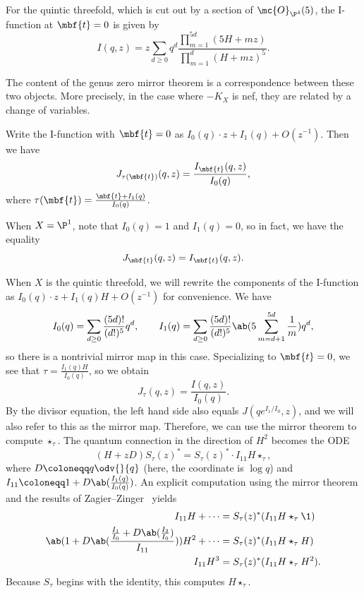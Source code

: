 \begin{exm}
    For the quintic threefold, which is cut out by a section of \(\mc{O}_{\P^4}(5)\), the I-function at \(\mbf{t} = 0\) is given by
    \[ I(q,z) = z \sum_{d \geq 0} q^d \frac{\prod_{m=1}^{5d}(5H+mz)}{\prod_{m=1}^d (H+mz)^5}. \]
\end{exm}

The content of the genus zero mirror theorem is a correspondence between these two objects. More precisely, in the case where \(-K_X\) is nef, they are related by a change of variables.

\begin{thm}
    Write the I-function with \(\mbf{t} = 0\) as \(I_0(q) \cdot z + I_1(q) + O(z^{-1})\). Then we have 
    \[
        J_{\tau(\mbf{t})}(q,z) = \frac{I_{\mbf{t}}(q,z)}{I_0(q)},
    \]
    where \(\tau(\mbf{t}) = \frac{\mbf{t} + I_1(q)}{I_0(q)}\). 
\end{thm}

\begin{exm}
    When \(X = \P^1\), note that \(I_0(q) = 1\) and \(I_1(q) = 0\), so in fact, we have the equality
    \[ J_{\mbf{t}}(q,z) = I_{\mbf{t}}(q,z). \]
\end{exm}

\begin{exm}
    When \(X\) is the quintic threefold, we will rewrite the components of the I-function as \(I_0(q) \cdot z + I_1(q)H + O(z^{-1})\) for convenience. We have
    \[ I_0(q) = \sum_{d \geq 0} \frac{(5d)!}{(d!)^5} q^d, \qquad I_1(q) = \sum_{d \geq 0} \frac{(5d)!}{(d!)^5} \ab(5\sum_{m=d+1}^{5d} \frac{1}{m}) q^d, \]
    so there is a nontrivial mirror map in this case. Specializing to \(\mbf{t} = 0\), we see that \(\tau = \frac{I_1(q)H}{I_0(q)}\), so we obtain
    \[ J_{\tau}(q,z) = \frac{I(q,z)}{I_0(q)}. \]
    By the divisor equation, the left hand side also equals \(J(qe^{I_1/I_0}, z)\), and we will also refer to this as the mirror map.  
    Therefore, we can use the mirror theorem to compute $\star_{\tau}$. The quantum connection in the direction of \(H^2\) becomes the ODE
    \[ (H+zD) S_{\tau}(z)^* = S_{\tau}(z)^* \cdot I_{11} H \star_{\tau}, \]
    where $D \coloneqq q \odv{}{q}$ (here, the coordinate is $\log q$) and $I_{11} \coloneqq 1 + D \ab(\frac{I_1(q)}{I_0(q)})$. An explicit computation using the mirror theorem and the results of Zagier--Zinger~\cite{ZagierZinger2008} yields
    \begin{align*}
        I_{11} H + \cdots &= S_{\tau}(z)^* (I_{11} H \star_{\tau} \1) \\
        \ab( 1 + D\ab(\frac{\frac{I_1}{I_0} + D \ab(\frac{I_2}{I_0})}{I_{11}}) ) H^2 + \cdots &= S_{\tau}(z)^* (I_{11} H \star_{\tau} H) \\
        I_{11} H^3 &= S_{\tau}(z)^* (I_{11}H \star_{\tau} H^2).
    \end{align*}
    Because $S_{\tau}$ begins with the identity, this computes $H \star_{\tau}$.
\end{exm}

